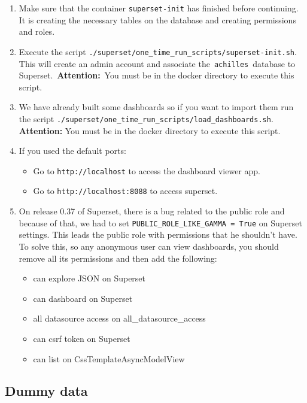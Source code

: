 \documentclass[
]{book}
\providecommand{\tightlist}{%
  \setlength{\itemsep}{0pt}\setlength{\parskip}{0pt}}
\begin{document}
\begin{enumerate}
\def\labelenumi{\arabic{enumi}.}
\item
  Make sure that the container \texttt{superset-init} has finished before continuing. It is creating the necessary tables on the database and creating permissions and roles.
\item
  Execute the script \texttt{./superset/one\_time\_run\_scripts/superset-init.sh}. This will create an admin account and associate the~\texttt{achilles}~database to Superset.~\textbf{Attention:}~You must be in the docker directory to execute this script.
\item
  We have already built some dashboards so if you want to import them run the script \texttt{./superset/one\_time\_run\_scripts/load\_dashboards.sh}. \textbf{Attention:} You must be in the docker directory to execute this script.
\item
  If you used the default ports:

  \begin{itemize}
  \tightlist
  \item
    Go to \texttt{http://localhost} to access the dashboard viewer app.
  \item
    Go to \texttt{http://localhost:8088} to access superset.
  \end{itemize}
\item
  On release 0.37 of Superset, there is a bug related to the public role and because of that, we had to set \texttt{PUBLIC\_ROLE\_LIKE\_GAMMA\ =\ True} on Superset settings. This leads the public role with permissions that he shouldn't have. To solve this, so any anonymous user can view dashboards, you should remove all its permissions and then add the following:

  \begin{itemize}
  \tightlist
  \item
    can explore JSON on Superset
  \item
    can dashboard on Superset
  \item
    all datasource access on all\_datasource\_access
  \item
    can csrf token on Superset
  \item
    can list on CssTemplateAsyncModelView
  \end{itemize}
\end{enumerate}

\hypertarget{dummy-data}{%
\subsection*{Dummy data}\label{dummy-data}}
\end{document}
